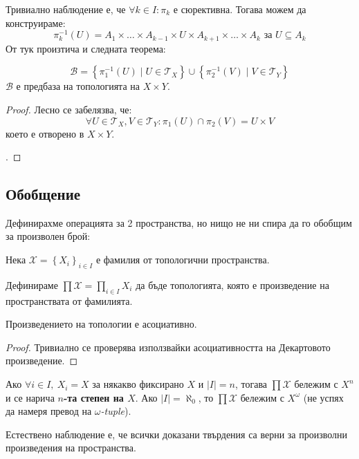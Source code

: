 Тривиално наблюдение е, че $\forall k \in I: \pi_k$ е сюрективна. Тогава можем да конструираме:
\begin{equation*}
    \pi_k^{-1}(U) = A_1 \times \dots \times A_{k-1} \times U \times A_{k+1} \times \dots \times A_k \text{ за } U \subseteq A_k
\end{equation*}
От тук произтича и следната теорема:
\begin{theorem}
    \begin{equation*}
        \mathcal B = \left\{ \pi_1^{-1}(U) \mid U \in \mathcal T_X \right\} \cup \left\{ \pi_2^{-1}(V) \mid V \in \mathcal T_Y \right\}
    \end{equation*}
    $\mathcal B$ е предбаза на топологията на $X \times Y$.
\end{theorem}
\begin{proof}
    Лесно се забелязва, че:
    \begin{equation*}
        \forall U \in \mathcal T_X, V\in \mathcal T_Y : \pi_1(U) \cap \pi_2(V) = U \times V
    \end{equation*}
    което е отворено в $X \times Y$.
    
    \cite[стр.~88]{munkrestopology}.
\end{proof}

\subsection{Обобщение}
Дефинирахме операцията за 2 пространства, но нищо не ни спира да го обобщим за произволен брой:
\begin{definition}
    Нека $\mathcal X = \left\{X_i\right\}_{i \in I}$ е фамилия от топологични пространства.

    Дефинираме $\prod \mathcal X = \prod\limits_{i \in I}X_i$ да бъде топологията, която е произведение на пространствата от фамилията.
\end{definition}
\begin{proposition}
    Произведението на топологии е асоциативно.
\end{proposition}
\begin{proof}
    Тривиално се проверява използвайки асоциативността на Декартовото произведение.
\end{proof}
\begin{notation}
    Ако $\forall i \in I,\ X_i = X$ за някакво фиксирано $X$ и $|I| = n$, тогава $\prod \mathcal X $ бележим с $X^n$ и се нарича \textbf{$n$-та степен на $X$}. Ако $|I| = \aleph_0$, то $\prod \mathcal X $ бележим с $X^\omega$ (не успях да намеря превод на \emph{$\omega$-tuple}).
\end{notation}
Естествено наблюдение е, че всички доказани твърдения са верни за произволни произведения на пространства.

